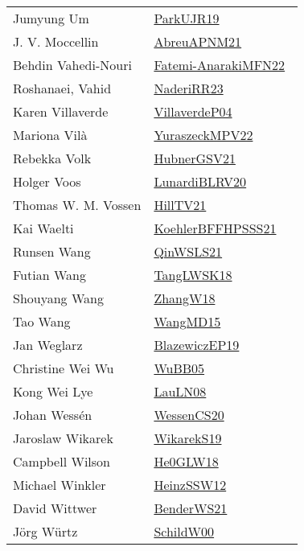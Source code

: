 {\begin{longtable}{p{4cm}p{20cm}}
Jumyung Um & \href{works/ParkUJR19.pdf}{ParkUJR19}~\cite{ParkUJR19}\\
J. V. Moccellin & \href{works/AbreuAPNM21.pdf}{AbreuAPNM21}~\cite{AbreuAPNM21}\\
Behdin Vahedi-Nouri & \href{}{Fatemi-AnarakiMFN22}~\cite{Fatemi-AnarakiMFN22}\\
Roshanaei, Vahid & \href{works/NaderiRR23.pdf}{NaderiRR23}~\cite{NaderiRR23}\\
Karen Villaverde & \href{}{VillaverdeP04}~\cite{VillaverdeP04}\\
Mariona Vil{\`a} & \href{works/YuraszeckMPV22.pdf}{YuraszeckMPV22}~\cite{YuraszeckMPV22}\\
Rebekka Volk & \href{works/HubnerGSV21.pdf}{HubnerGSV21}~\cite{HubnerGSV21}\\
Holger Voos & \href{works/LunardiBLRV20.pdf}{LunardiBLRV20}~\cite{LunardiBLRV20}\\
Thomas W. M. Vossen & \href{works/HillTV21.pdf}{HillTV21}~\cite{HillTV21}\\
Kai Waelti & \href{works/KoehlerBFFHPSSS21.pdf}{KoehlerBFFHPSSS21}~\cite{KoehlerBFFHPSSS21}\\
Runsen Wang & \href{works/QinWSLS21.pdf}{QinWSLS21}~\cite{QinWSLS21}\\
Futian Wang & \href{works/TangLWSK18.pdf}{TangLWSK18}~\cite{TangLWSK18}\\
Shouyang Wang & \href{works/ZhangW18.pdf}{ZhangW18}~\cite{ZhangW18}\\
Tao Wang & \href{works/WangMD15.pdf}{WangMD15}~\cite{WangMD15}\\
Jan Weglarz & \href{}{BlazewiczEP19}~\cite{BlazewiczEP19}\\
Christine Wei Wu & \href{works/WuBB05.pdf}{WuBB05}~\cite{WuBB05}\\
Kong Wei Lye & \href{works/LauLN08.pdf}{LauLN08}~\cite{LauLN08}\\
Johan Wess{\'{e}}n & \href{works/WessenCS20.pdf}{WessenCS20}~\cite{WessenCS20}\\
Jaroslaw Wikarek & \href{works/WikarekS19.pdf}{WikarekS19}~\cite{WikarekS19}\\
Campbell Wilson & \href{works/He0GLW18.pdf}{He0GLW18}~\cite{He0GLW18}\\
Michael Winkler & \href{works/HeinzSSW12.pdf}{HeinzSSW12}~\cite{HeinzSSW12}\\
David Wittwer & \href{works/BenderWS21.pdf}{BenderWS21}~\cite{BenderWS21}\\
J{\"{o}}rg W{\"{u}}rtz & \href{works/SchildW00.pdf}{SchildW00}~\cite{SchildW00}\\

\end{longtable}}
